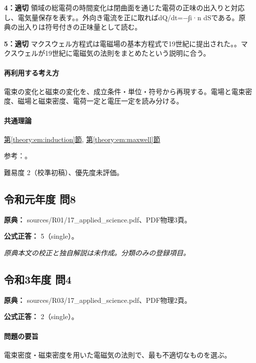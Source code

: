 \noindent\textbf{4：適切} 領域の総電荷の時間変化は閉曲面を通じた電荷の正味の出入りと対応し、電気量保存を表す。。外向き電流を正に取ればdQ/dt=−∫i·n dSである。原典の出入りは符号付きの正味量として読む。\par

\noindent\textbf{5：適切} マクスウェル方程式は電磁場の基本方程式で19世紀に提出された。。マクスウェルが19世紀に電磁気の法則をまとめたという説明に合う。\par

\paragraph{再利用する考え方} 電束の変化と磁束の変化を、成立条件・単位・符号から再現する。電場と電束密度、磁場と磁束密度、電荷一定と電圧一定を読み分ける。

\paragraph{共通理論} \hyperref[theory:em:induction]{第\ref*{theory:em:induction}節}, \hyperref[theory:em:maxwell]{第\ref*{theory:em:maxwell}節}

\par 参考：\cite{mit_em10,mit_em13}。

\par 難易度 2（校準初稿）、優先度未評価。

\subsection{令和元年度 問8}
\label{q:r01-reg-applied-08}

\noindent\textbf{原典：} sources/R01/17\_applied\_science.pdf、PDF物理3頁。

\textbf{公式正答：} 5（single）。

\par\textit{原典本文の校正と独自解説は未作成。分類のみの登録項目。}

\subsection{令和3年度 問4}
\label{q:r03-reg-applied-04}

\noindent\textbf{原典：} sources/R03/17\_applied\_science.pdf、PDF物理2頁。

\textbf{公式正答：} 2（single）。

\paragraph{問題の要旨} 電束密度・磁束密度を用いた電磁気の法則で、最も不適切なものを選ぶ。

